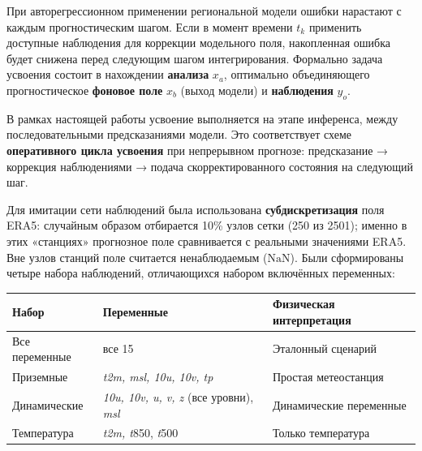 \documentclass[14pt,a4paper]{extarticle}
\newcounter{none}
\numberwithin{table}{section}
\numberwithin{figure}{section}
\numberwithin{equation}{section}
\begin{document}
При авторегрессионном применении региональной модели ошибки нарастают с
каждым прогностическим шагом. Если в момент времени \(t_k\) применить
доступные наблюдения для коррекции модельного поля, накопленная ошибка
будет снижена перед следующим шагом интегрирования. Формально задача
усвоения состоит в нахождении \textbf{анализа} \(x_a\), оптимально
объединяющего прогностическое \textbf{фоновое поле} \(x_b\) (выход
модели) и \textbf{наблюдения} \(y_o\).

В рамках настоящей работы усвоение выполняется на этапе инференса, между
последовательными предсказаниями модели. Это соответствует схеме
\textbf{оперативного цикла усвоения} при непрерывном прогнозе:
предсказание → коррекция наблюдениями → подача скорректированного
состояния на следующий шаг.

Для имитации сети наблюдений была использована \textbf{субдискретизация}
поля ERA5: случайным образом отбирается 10\% узлов сетки (250 из 2501);
именно в этих «станциях» прогнозное поле сравнивается с реальными
значениями ERA5. Вне узлов станций поле считается ненаблюдаемым
(\(\text{NaN}\)). Были сформированы четыре набора наблюдений,
отличающихся набором включённых переменных:

{\def\LTcaptype{none} %
\begin{longtable}[]{@{}
  >{\raggedright\arraybackslash}p{}
  >{\raggedright\arraybackslash}p{}
  >{\raggedright\arraybackslash}p{}@{}}
\toprule\noalign{}
\begin{minipage}[b]{\linewidth}\raggedright
Набор
\end{minipage} & \begin{minipage}[b]{\linewidth}\raggedright
Переменные
\end{minipage} & \begin{minipage}[b]{\linewidth}\raggedright
Физическая интерпретация
\end{minipage} \\
\midrule\noalign{}
\endhead
\bottomrule\noalign{}
\endlastfoot
Все переменные & все 15 & Эталонный сценарий \\
Приземные & \emph{t2m, msl, 10u, 10v, tp} & Простая метеостанция \\
Динамические & \emph{10u, 10v, u, v, z} (все уровни), \emph{msl} &
Динамические переменные \\
Температура & \emph{t2m, t}850, \emph{t}500 & Только температура \\
\end{longtable}
}
\end{document}
